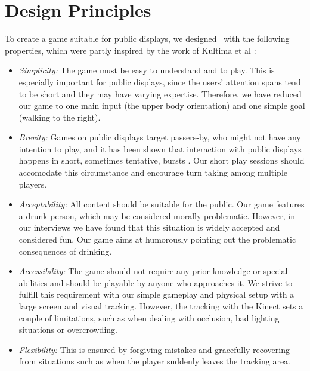 \documentclass{chi-ext}
\begin{document}
%

\section{Design Principles}
%
To create a game suitable for public displays, we designed \drunkened\ with the following properties, which were partly inspired by the work of Kultima et al \cite{kultima2009casual}:
\begin{itemize}\compresslist
\item \textit{Simplicity:} The game must be easy to understand and to play. This is especially important for public displays, since the users' attention spans tend to be short and they may have varying expertise. Therefore, we have reduced our game to one main input (the upper body orientation) and one simple goal (walking to the right).
\item \textit{Brevity:} Games on public displays target passers-by, who might not have any intention to play, and it has been shown that interaction with public displays happens in short, sometimes tentative, bursts \cite{walter2013strikeapose}. Our short play sessions should accomodate this circumstance and encourage turn taking among multiple players.
\item \textit{Acceptability:} All content should be suitable for the public. Our game features a drunk person, which may be considered morally problematic. However, in our interviews we have found that this situation is widely accepted and considered fun. Our game aims at humorously pointing out the problematic consequences of drinking.
\item \textit{Accessibility:} The game should not require any prior knowledge or special abilities and should be playable by anyone who approaches it. We strive to fulfill this requirement with our  simple gameplay and physical setup with a large screen and visual tracking. However, the tracking with the Kinect sets a couple of limitations, such as when dealing with occlusion, bad lighting situations or overcrowding.
\item \textit{Flexibility:} This is ensured by forgiving mistakes and gracefully recovering from situations such as when the player suddenly leaves the tracking area.
\end{itemize}
\end{document}
